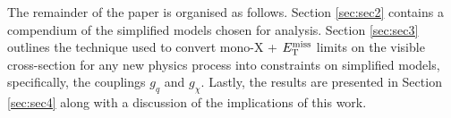 \begin{flushleft}
The remainder of the paper is organised as follows. Section \ref{sec:sec2} contains a compendium of the simplified models chosen for analysis. Section \ref{sec:sec3} outlines the technique used to convert mono-X + $E_{\mathrm{T}}^{\mathrm{miss}}$ limits on the visible cross-section for any new physics process into constraints on simplified models, specifically, the couplings $g_q$ and $g_{\chi}$. Lastly, the results are presented in Section \ref{sec:sec4} along with a discussion of the implications of this work.
\end{flushleft}
